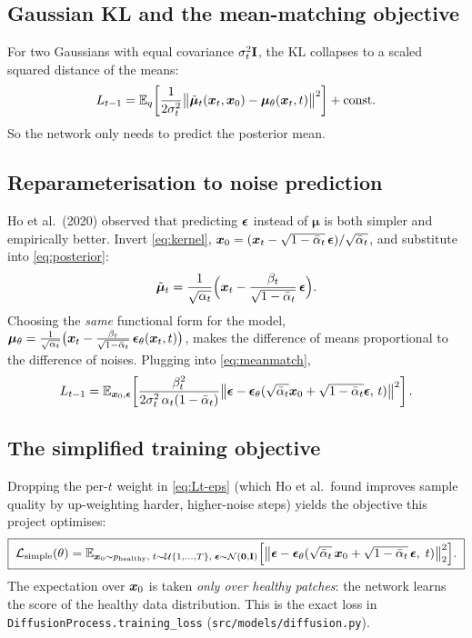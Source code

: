 \subsection{Gaussian KL and the mean-matching objective}
For two Gaussians with equal covariance $\sigma_t^2\mathbf{I}$, the KL collapses to a
scaled squared distance of the means:
\begin{equation}
L_{t-1}=\mathbb{E}_q\!\left[\frac{1}{2\sigma_t^2}\big\|\tilde{\bm\mu}_t(\bm{x}_t,\bm{x}_0)-\bm\mu_\theta(\bm{x}_t,t)\big\|^2\right]+\text{const}.
\label{eq:meanmatch}
\end{equation}
So the network only needs to predict the posterior mean.

\subsection{Reparameterisation to noise prediction}
Ho et al.\ (2020) observed that predicting $\bm{\epsilon}$ instead of $\bm\mu$ is both
simpler and empirically better. Invert \eqref{eq:kernel},
$\bm{x}_0=(\bm{x}_t-\sqrt{1-\bar{\alpha}_t}\,\bm{\epsilon})/\sqrt{\bar{\alpha}_t}$, and substitute into
\eqref{eq:posterior}:
\begin{equation}
\tilde{\bm\mu}_t=\frac{1}{\sqrt{\alpha_t}}\Big(\bm{x}_t-\frac{\beta_t}{\sqrt{1-\bar{\alpha}_t}}\,\bm{\epsilon}\Big).
\label{eq:mu-eps}
\end{equation}
Choosing the \emph{same} functional form for the model,
$\bm\mu_\theta=\frac{1}{\sqrt{\alpha_t}}\big(\bm{x}_t-\frac{\beta_t}{\sqrt{1-\bar{\alpha}_t}}\,\bm{\epsilon}_\theta(\bm{x}_t,t)\big)$,
makes the difference of means proportional to the difference of noises. Plugging
into \eqref{eq:meanmatch},
\begin{equation}
L_{t-1}=\mathbb{E}_{\bm{x}_0,\bm{\epsilon}}\!\left[\frac{\beta_t^2}{2\sigma_t^2\,\alpha_t(1-\bar{\alpha}_t)}
\big\|\bm{\epsilon}-\bm{\epsilon}_\theta(\sqrt{\bar{\alpha}_t}\bm{x}_0+\sqrt{1-\bar{\alpha}_t}\bm{\epsilon},\,t)\big\|^2\right].
\label{eq:Lt-eps}
\end{equation}

\subsection{The simplified training objective}
Dropping the per-$t$ weight in \eqref{eq:Lt-eps} (which Ho et al.\ found improves
sample quality by up-weighting harder, higher-noise steps) yields the objective
this project optimises:
\begin{equation}
\boxed{\;
\mathcal{L}_{\text{simple}}(\theta)=
\mathbb{E}_{\bm{x}_0\sim p_{\text{healthy}},\;t\sim\mathcal U\{1,\dots,T\},\;\bm{\epsilon}\sim\mathcal{N}(\bm0,\mathbf{I})}
\Big[\big\|\bm{\epsilon}-\bm{\epsilon}_\theta(\sqrt{\bar{\alpha}_t}\,\bm{x}_0+\sqrt{1-\bar{\alpha}_t}\,\bm{\epsilon},\;t)\big\|_2^2\Big].
\;}
\label{eq:simple}
\end{equation}
The expectation over $\bm{x}_0$ is taken \emph{only over healthy patches}: the network
learns the score of the healthy data distribution. This is the exact loss in
\texttt{DiffusionProcess.training\_loss} (\texttt{src/models/diffusion.py}).

